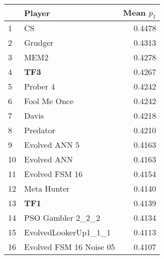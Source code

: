 \begin{tabular}{llr}
\toprule
{} &                   Player &  Mean $p_1$ \\
\midrule
1  &                       CS &      0.4478 \\
2  &                  Grudger &      0.4313 \\
3  &                     MEM2 &      0.4278 \\
4  &                      \textbf{TF3} &      0.4267 \\
5  &                 Prober 4 &      0.4242 \\
6  &             Fool Me Once &      0.4242 \\
7  &                    Davis &      0.4218 \\
8  &                 Predator &      0.4210 \\
9  &            Evolved ANN 5 &      0.4163 \\
10 &              Evolved ANN &      0.4163 \\
11 &           Evolved FSM 16 &      0.4154 \\
12 &              Meta Hunter &      0.4140 \\
13 &                      \textbf{TF1} &      0.4139 \\
14 &        PSO Gambler 2\_2\_2 &      0.4134 \\
15 &     EvolvedLookerUp1\_1\_1 &      0.4113 \\
16 &  Evolved FSM 16 Noise 05 &      0.4107 \\
\bottomrule
\end{tabular}
